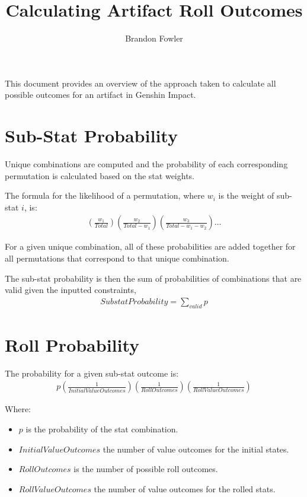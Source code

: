 \documentclass[12pt]{article}
\title{Calculating Artifact Roll Outcomes}
\author{Brandon Fowler}
\begin{document}
	
\maketitle

This document provides an overview of the approach taken to calculate all possible outcomes for an artifact in Genshin Impact.

\tableofcontents
\pagebreak

\section{Sub-Stat Probability}
	
Unique combinations are computed and the probability of each corresponding permutation is calculated based on the stat weights.

The formula for the likelihood of a permutation, where $w_i$ is the weight of sub-stat $i$, is:
\begin{align*}
	\left(\frac{w_1}{Total}\right)\left(\frac{w_2}{Total - w_1}\right)\left(\frac{w_3}{Total - w_1 - w_2}\right)\dots
\end{align*}

For a given unique combination, all of these probabilities are added together for all permutations that correspond to that unique combination.

The sub-stat probability is then the sum of probabilities of combinations that are valid given the inputted constraints,
\begin{align*}
	SubstatProbability = \sum_{valid} p
\end{align*}
	
\section{Roll Probability}

The probability for a given sub-stat outcome is:
\begin{align*}
	p\left(\frac{1}{InitialValueOutcomes}\right)\left(\frac{1}{RollOutcomes}\right)\left(\frac{1}{RollValueOutcomes}\right)
\end{align*}

Where:
\begin{itemize}[]
	\item $p$ is the probability of the stat combination.
	\item $InitialValueOutcomes$ the number of value outcomes for the initial states.
	\item $RollOutcomes$ is the number of possible roll outcomes.
	\item $RollValueOutcomes$ the number of value outcomes for the rolled stats.
\end{itemize}
\end{document}
